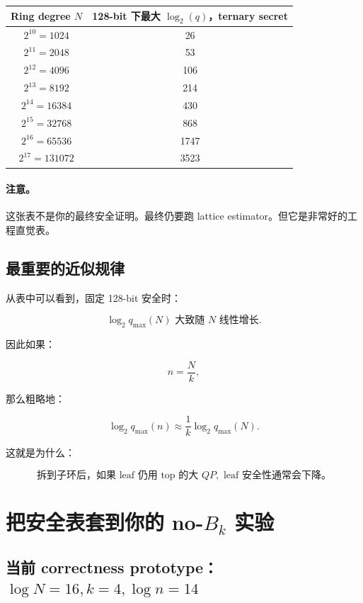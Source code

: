 \documentclass[UTF8,11pt,a4paper]{ctexart}
\begin{document}
\begin{center}
\begin{tabular}{cc}
\toprule
Ring degree $N$ & 128-bit 下最大 $\log_2(q)$，ternary secret \\
\midrule
$2^{10}=1024$ & 26 \\
$2^{11}=2048$ & 53 \\
$2^{12}=4096$ & 106 \\
$2^{13}=8192$ & 214 \\
$2^{14}=16384$ & 430 \\
$2^{15}=32768$ & 868 \\
$2^{16}=65536$ & 1747 \\
$2^{17}=131072$ & 3523 \\
\bottomrule
\end{tabular}
\end{center}

\paragraph{注意。}
这张表不是你的最终安全证明。最终仍要跑 lattice estimator。但它是非常好的工程直觉表。

\subsection{最重要的近似规律}

从表中可以看到，固定 128-bit 安全时：

\[
\boxed{
\log_2 q_{\max}(N)
\text{ 大致随 } N \text{ 线性增长}.
}
\]

因此如果：

\[
n=\frac{N}{k},
\]

那么粗略地：

\[
\log_2 q_{\max}(n)
\approx
\frac{1}{k}\log_2 q_{\max}(N).
\]

这就是为什么：

\[
\boxed{
\text{拆到子环后，如果 leaf 仍用 top 的大 } QP,\text{ leaf 安全性通常会下降。}
}
\]

\section{把安全表套到你的 no-$B_k$ 实验}

\subsection{当前 correctness prototype：$\log N=16,k=4,\log n=14$}
\end{document}
